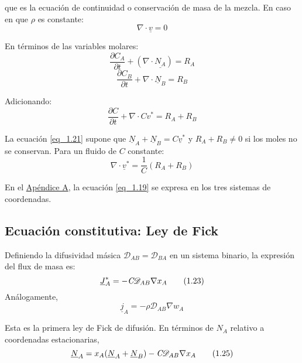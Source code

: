  que es la ecuación de continuidad o conservación de masa de la mezcla. En caso en que $\rho$ es constante:
 \begin{equation}
 	\nabla \cdot \underline{v} = 0 \tag{1.18}\label{eq_1.18}
 \end{equation}
 
 En términos de las variables molares:
 \begin{equation}
 	\frac{\partial C_A}{\partial t} + (\nabla \cdot \underline{N_A}) = R_A \tag{1.19} \label{eq_1.19}
 \end{equation}
 \begin{equation}
 	\frac{\partial C_B}{\partial t} + \nabla \cdot \underline{N}_B = R_B \tag{1.20} \label{eq_1.20}
 \end{equation}
 
 Adicionando:
 \begin{equation}
 	\frac{\partial C}{\partial t} + \nabla \cdot C {v}^* = R_A + R_B \tag{1.21} \label{eq_1.21}
 \end{equation}
 
 La ecuación \ref{eq_1.21} supone que $\underline{N}_A +\underline{ N}_B = C \underline{v}^*$ y $R_A + R_B \neq 0$ si los moles no se conservan. Para un fluido de $C$ constante:
 \begin{equation}
 	\nabla \cdot \underline{v}^* = \frac{1}{C} (R_A + R_B) \tag{1.22}
    \label{eq_1.22}
 \end{equation}
 
 En el \underline{Apéndice A}, la ecuación \ref{eq_1.19} se expresa en los tres sistemas de coordenadas.



 \subsection{Ecuación constitutiva: Ley de Fick}

Definiendo la difusividad másica $\mathscr{D}_{AB}=\mathscr{D}_{BA}$ en un sistema binario, la expresión del flux de masa es:
\begin{equation}
	\underline{J}_A^* = - \emph{C} \mathscr{D}_{AB} \nabla x_A  \tag{1.23}
    \label{eq_1.23}
\end{equation}
Análogamente,
\begin{equation}
	\underline{j}_A = - \rho \mathscr{D}_{AB} \nabla w_A  \tag{1.24}\label{eq_1.24}
\end{equation}

Esta es la primera ley de Fick de difusión. En términos de $N_A$ relativo a coordenadas estacionarias,
\begin{equation}
	\underline{N}_A = x_A (\underline{N}_A + \underline{N}_B) - \emph{C} \mathscr{D}_{AB} \nabla x_A  \tag{1.25}\label{eq_1.25}
\end{equation}

